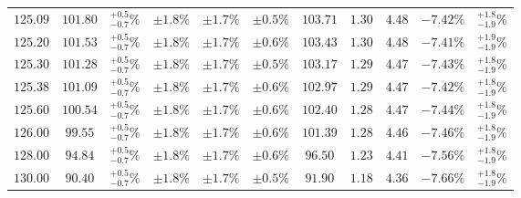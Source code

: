 \begin{table}[ht!]
{{\begin{tabular}{| cc | c | ccc | cccc | c |}
$125.09$ & $101.80$ & $^{+0.5}_{-0.7}\%$ & $\pm 1.8\%$ & {\color{black!55}$\pm 1.7\%$} & {\color{black!55}$\pm 0.5\%$} & $103.71$ & $1.30$ & $4.48$ & $-7.42\%$ & $^{+1.8}_{-1.9}\%$ \\
$125.20$ & $101.53$ & $^{+0.5}_{-0.7}\%$ & $\pm 1.8\%$ & {\color{black!55}$\pm 1.7\%$} & {\color{black!55}$\pm 0.6\%$} & $103.43$ & $1.30$ & $4.48$ & $-7.41\%$ & $^{+1.9}_{-1.9}\%$ \\
$125.30$ & $101.28$ & $^{+0.5}_{-0.7}\%$ & $\pm 1.8\%$ & {\color{black!55}$\pm 1.7\%$} & {\color{black!55}$\pm 0.5\%$} & $103.17$ & $1.29$ & $4.47$ & $-7.43\%$ & $^{+1.8}_{-1.9}\%$ \\
$125.38$ & $101.09$ & $^{+0.5}_{-0.7}\%$ & $\pm 1.8\%$ & {\color{black!55}$\pm 1.7\%$} & {\color{black!55}$\pm 0.6\%$} & $102.97$ & $1.29$ & $4.47$ & $-7.42\%$ & $^{+1.8}_{-1.9}\%$ \\
$125.60$ & $100.54$ & $^{+0.5}_{-0.7}\%$ & $\pm 1.8\%$ & {\color{black!55}$\pm 1.7\%$} & {\color{black!55}$\pm 0.6\%$} & $102.40$ & $1.28$ & $4.47$ & $-7.44\%$ & $^{+1.8}_{-1.9}\%$ \\
$126.00$ & $99.55$ & $^{+0.5}_{-0.7}\%$ & $\pm 1.8\%$ & {\color{black!55}$\pm 1.7\%$} & {\color{black!55}$\pm 0.6\%$} & $101.39$ & $1.28$ & $4.46$ & $-7.46\%$ & $^{+1.8}_{-1.9}\%$ \\
$128.00$ & $94.84$ & $^{+0.5}_{-0.7}\%$ & $\pm 1.8\%$ & {\color{black!55}$\pm 1.7\%$} & {\color{black!55}$\pm 0.6\%$} & $96.50$ & $1.23$ & $4.41$ & $-7.56\%$ & $^{+1.8}_{-1.9}\%$ \\
$130.00$ & $90.40$ & $^{+0.5}_{-0.7}\%$ & $\pm 1.8\%$ & {\color{black!55}$\pm 1.7\%$} & {\color{black!55}$\pm 0.5\%$} & $91.90$ & $1.18$ & $4.36$ & $-7.66\%$ & $^{+1.8}_{-1.9}\%$ \\
\cline{1-11}
\end{tabular}
}
}
\end{table}


